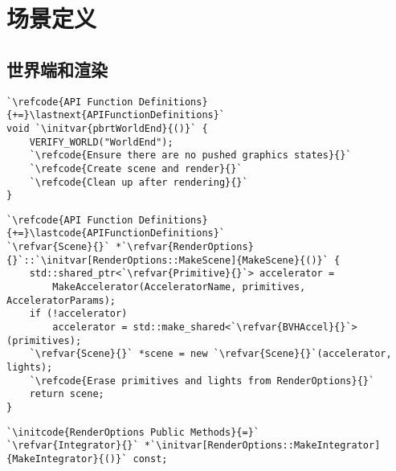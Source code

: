\section{场景定义}\label{sec:场景定义}

\subsection{世界端和渲染}\label{sub:世界端和渲染}
\begin{lstlisting}
`\refcode{API Function Definitions}{+=}\lastnext{APIFunctionDefinitions}`
void `\initvar{pbrtWorldEnd}{()}` {
    VERIFY_WORLD("WorldEnd");
    `\refcode{Ensure there are no pushed graphics states}{}`
    `\refcode{Create scene and render}{}`
    `\refcode{Clean up after rendering}{}`
}
\end{lstlisting}

\begin{lstlisting}
`\refcode{API Function Definitions}{+=}\lastcode{APIFunctionDefinitions}`
`\refvar{Scene}{}` *`\refvar{RenderOptions}{}`::`\initvar[RenderOptions::MakeScene]{MakeScene}{()}` {
    std::shared_ptr<`\refvar{Primitive}{}`> accelerator =
        MakeAccelerator(AcceleratorName, primitives, AcceleratorParams);
    if (!accelerator)
        accelerator = std::make_shared<`\refvar{BVHAccel}{}`>(primitives);
    `\refvar{Scene}{}` *scene = new `\refvar{Scene}{}`(accelerator, lights);
    `\refcode{Erase primitives and lights from RenderOptions}{}`
    return scene;
}
\end{lstlisting}

\begin{lstlisting}
`\initcode{RenderOptions Public Methods}{=}` 
`\refvar{Integrator}{}` *`\initvar[RenderOptions::MakeIntegrator]{MakeIntegrator}{()}` const;
\end{lstlisting}